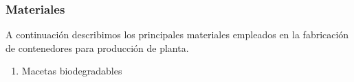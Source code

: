 \documentclass[a4paper,12pt,oneside]{article}
\begin{document}
\subsubsection{Materiales}
\label{sec:org0e111f4}
A continuación describimos los principales materiales empleados en la
fabricación de contenedores para producción de planta.
\begin{enumerate}
\item Macetas biodegradables
\label{sec:orga1b41ff}
\end{enumerate}
\end{document}
